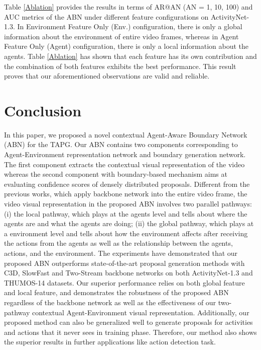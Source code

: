 \documentclass{ieeeaccess}
\begin{document}
Table \ref{Ablation} provides the results in terms of AR@AN (AN = 1, 10, 100) and AUC metrics of the ABN under different feature configurations on ActivityNet-1.3. In Environment Feature Only (Env.) configuration, there is only a global information about the environment of entire video frames, whereas in Agent Feature Only (Agent) configuration, there is only a local information about the agents. Table \ref{Ablation} has shown that each feature has its own contribution and the combination of both features exhibits the best performance. This result proves that our aforementioned observations are valid and reliable.



\section*{Conclusion}
In this paper, we proposed a novel contextual Agent-Aware Boundary Network (ABN) for the TAPG. Our ABN contains two components corresponding to Agent-Environment representation network and boundary generation network. The first component extracts the contextual visual representation of the video whereas the second component with boundary-based
mechanism aims at evaluating confidence scores of densely distributed proposals. 
Different from the previous works, which apply backbone network into the entire video frame, the video visual representation in the proposed ABN involves two parallel pathways: (i) the local pathway, which plays at the agents level and tells about where the agents are and what the agents are doing; (ii) the global pathway, which plays at a environment level and tells about how the environment affects after receiving the actions from the agents as well as the relationship between the agents, actions, and the environment. The experiments have demonstrated that our proposed ABN outperforms state-of-the-art proposal generation methods with C3D, SlowFast and Two-Stream backbone networks on both ActivityNet-1.3 and THUMOS-14 datasets. Our superior performance relies on both global feature and local feature, and demonstrates the robustness of the proposed ABN regardless of the backbone network as well as the effectiveness of our two-pathway contextual Agent-Environment visual representation. Additionally, our proposed method can also be generalized well to generate proposals for activities and actions that it never sees in training phase. Therefore, our method also shows the superior results in further applications like action detection task.
\end{document}
